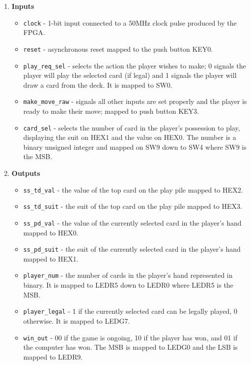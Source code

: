 \documentclass[12pt]{article}
\begin{document}
\begin{enumerate}
\item \textbf{Inputs}
\begin{itemize}
\item \texttt{clock} - 1-bit input connected to a 50MHz clock pulse produced by the FPGA.
\item \texttt{reset} - asynchronous reset mapped to the push button KEY0.
\item \texttt{play\_req\_sel} - selects the action the player wishes to make; 0 signals the player will play the selected card (if legal) and 1 signals the player will draw a card from the deck. It is mapped to SW0.
\item \texttt{make\_move\_raw} - signals all other inputs are set properly and the player is ready to make their move; mapped to push button KEY3.
\item \texttt{card\_sel} - selects the number of card in the player's possession to play, displaying the suit on HEX1 and the value on HEX0. The number is a binary unsigned integer and mapped on SW9 down to SW4 where SW9 is the MSB.
\end{itemize}
\item \textbf{Outputs}
\begin{itemize}
\item \texttt{ss\_td\_val} - the value of the top card on the play pile mapped to HEX2.
\item \texttt{ss\_td\_suit} - the suit of the top card on the play pile mapped to HEX3.
\item \texttt{ss\_pd\_val} - the value of the currently selected card in the player's hand mapped to HEX0.
\item \texttt{ss\_pd\_suit} - the suit of the currently selected card in the player's hand mapped to HEX1.
\item \texttt{player\_num} - the number of cards in the player's hand represented in binary. It is mapped to LEDR5 down to LEDR0 where LEDR5 is the MSB.
\item \texttt{player\_legal} - 1 if the currently selected card can be legally played, 0 otherwise. It is mapped to LEDG7.
\item \texttt{win\_out} - 00 if the game is ongoing, 10 if the player has won, and 01 if the computer has won. The MSB is mapped to LEDG0 and the LSB is mapped to LEDR9.
\end{itemize}
\end{enumerate}
\end{document}
